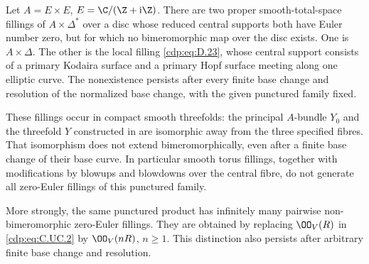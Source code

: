 \begin{proposition}\hypertarget{tag-01D8}{}\label{cdp:st:C.2.UN.3}

Let $A=E\times E$, $E=\C/(\Z+\mathrm i\Z)$.
There are two proper smooth-total-space fillings of
$A\times\Delta^*$ over a disc whose reduced central
supports both have Euler number zero, but for which
no bimeromorphic map over the disc exists. One is
$A\times\Delta$. The other is the local filling
\eqref{cdp:eq:D.23}, whose central support consists of a primary
Kodaira surface and a primary Hopf surface meeting
along one elliptic curve. The nonexistence persists
after every finite base change and resolution of the
normalized base change, with the given punctured
family fixed.

These fillings occur in compact smooth threefolds:
the principal $A$-bundle $Y_0$ and the threefold $Y$
constructed in  are isomorphic away from the
three specified fibres. That isomorphism does not
extend bimeromorphically, even after a finite base
change of their base curve. In particular smooth
torus fillings, together with modifications by
blowups and blowdowns over the central fibre, do
not generate all zero-Euler fillings of this
punctured family.

More strongly, the same punctured product has
infinitely many pairwise non-bimeromorphic
zero-Euler fillings. They are obtained by replacing
$\OO_V(R)$ in \eqref{cdp:eq:C.UC.2} by $\OO_V(nR)$,
$n\ge1$. This distinction also persists after
arbitrary finite base change and resolution.
\end{proposition}



